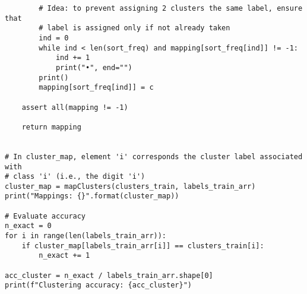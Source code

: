 \documentclass[12pt]{article}
\begin{document}
\begin{verbatim}
        # Idea: to prevent assigning 2 clusters the same label, ensure that
        # label is assigned only if not already taken
        ind = 0
        while ind < len(sort_freq) and mapping[sort_freq[ind]] != -1:
            ind += 1
            print("•", end="")
        print()
        mapping[sort_freq[ind]] = c

    assert all(mapping != -1)

    return mapping


# In cluster_map, element 'i' corresponds the cluster label associated with
# class 'i' (i.e., the digit 'i')
cluster_map = mapClusters(clusters_train, labels_train_arr)
print("Mappings: {}".format(cluster_map))

# Evaluate accuracy
n_exact = 0
for i in range(len(labels_train_arr)):
    if cluster_map[labels_train_arr[i]] == clusters_train[i]:
        n_exact += 1

acc_cluster = n_exact / labels_train_arr.shape[0]
print(f"Clustering accuracy: {acc_cluster}")

\end{verbatim}
\end{document}

